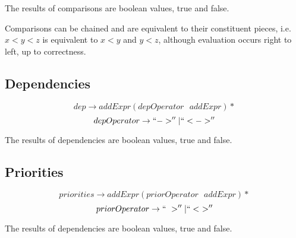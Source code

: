 \documentclass[12pt]{article}
\begin{document}
The results of comparisons are boolean values, true and false.

Comparisons can be chained and are equivalent to their constituent pieces, i.e. $x < y < z$ is equivalent to $x < y$ and $y < z$, although evaluation occurs right to left, up to correctness.

\subsection{Dependencies}

$$dep \rightarrow addExpr (depOperator \text{ } addExpr)*$$
$$depOperator \rightarrow ``->'' \vert ``<->''$$

The results of dependencies are boolean values, true and false. 

\subsection{Priorities}

$$priorities \rightarrow addExpr (priorOperator \text{ } addExpr)*$$
$$priorOperator \rightarrow ``~>'' \vert ``<~>''$$

The results of dependencies are boolean values, true and false.
\end{document}
